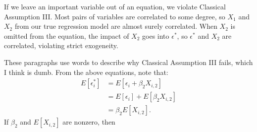 \documentclass[11pt,twoside,openany]{memoir}
\begin{document}
\begin{example}
            If we leave an important variable out of an equation, we violate Classical Assumption III. Most pairs of variables are correlated to some degree, so $X_1$ and $X_2$ from our true regression model are almost surely correlated. When $X_2$ is omitted from the equation, the impact of $X_2$ goes into $\epsilon^\ast$, so $\epsilon^\ast$ and $X_2$ are correlated, violating strict exogeneity.

            These paragraphs use words to describe why Classical Assumption III fails, which I think is dumb. From the above equations, note that:
                \begin{equation*}
                \begin{split}
                    E[\epsilon^\ast_i] 
                    & = E[\epsilon_i + \beta_2 X_{i,2}] \\
                    & = E[\epsilon_i] + E[\beta_2 X_{i,2}] \\
                    & = \beta_2 E[X_{i,2}].
                \end{split}
                \end{equation*}
            If $\beta_2$ and $E[X_{i,2}]$ are nonzero, then 
            
        \end{example}
\end{document}
